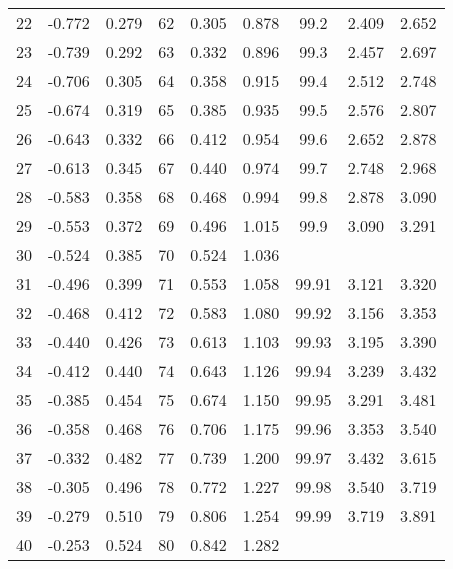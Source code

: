 \begin{table}
\begin{otherlanguage}{english}
\begin{tabular}{|C|C|C||C|C|C||C|C|C|}
22&-0.772&0.279&62&0.305&0.878&99.2&2.409&2.652\\
23&-0.739&0.292&63&0.332&0.896&99.3&2.457&2.697\\
24&-0.706&0.305&64&0.358&0.915&99.4&2.512&2.748\\
25&-0.674&0.319&65&0.385&0.935&99.5&2.576&2.807\\[1ex]
26&-0.643&0.332&66&0.412&0.954&99.6&2.652&2.878\\
27&-0.613&0.345&67&0.440&0.974&99.7&2.748&2.968\\
28&-0.583&0.358&68&0.468&0.994&99.8&2.878&3.090\\
29&-0.553&0.372&69&0.496&1.015&99.9&3.090&3.291\\
30&-0.524&0.385&70&0.524&1.036&& &  \\[0.5ex]
31&-0.496&0.399&71&0.553&1.058&99.91&3.121&3.320\Tstrut \\
32&-0.468&0.412&72&0.583&1.080&99.92&3.156&3.353\\
33&-0.440&0.426&73&0.613&1.103&99.93&3.195&3.390\\
34&-0.412&0.440&74&0.643&1.126&99.94&3.239&3.432\\
35&-0.385&0.454&75&0.674&1.150&99.95&3.291&3.481\\[1ex]
36&-0.358&0.468&76&0.706&1.175&99.96&3.353&3.540\\
37&-0.332&0.482&77&0.739&1.200&99.97&3.432&3.615\\
38&-0.305&0.496&78&0.772&1.227&99.98&3.540&3.719\\
39&-0.279&0.510&79&0.806&1.254&99.99&3.719&3.891\\
40&-0.253&0.524&80&0.842&1.282&&& \\
\hline
\end{tabular}
\end{otherlanguage}
\end{table}
